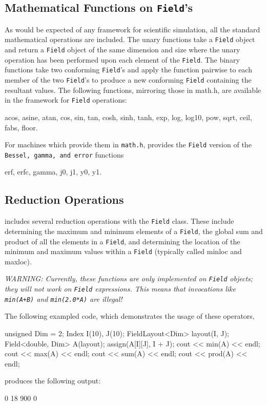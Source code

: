 \subsection{Mathematical Functions on \texttt{Field}'s}

As would be expected of any framework for scientific simulation, all the standard mathematical operations are included. The unary functions take a \texttt{Field} object and return a \texttt{Field} object of the same dimension and size where the unary operation has been performed upon each element of the \texttt{Field}. The binary functions take two conforming \texttt{Field}'s and apply the function pairwise to each member of the two \texttt{Field}'s to produce a new conforming \texttt{Field} containing the resultant values. The following
functions, mirroring those in math.h, are available in the framework for \texttt{Field} operations:
\begin{smallcode}
acos, asine, atan, cos, sin, tan, cosh, sinh, tanh, 
exp, log, log10, pow, sqrt, ceil, fabs, floor.
\end{smallcode}
For machines which provide them in \texttt{math.h}, \ippl provides the \texttt{Field} version of the \texttt{Bessel, gamma, and error} functions
\begin{smallcode}
erf, erfc, gamma, j0, j1, y0, y1.
\end{smallcode}

\subsection{Reduction Operations}

\ippl includes several reduction operations with the \texttt{Field} class. These include determining the maximum and minimum elements of a \texttt{Field}, the global sum and product of all the elements in a \texttt{Field}, and determining the location of the minimum and maximum values within a \texttt{Field} (typically called minloc and maxloc).

\textit{WARNING: Currently, these functions are only implemented on \texttt{Field} objects; they will not work on \texttt{Field} expressions. This means that invocations like \texttt{min(A+B)} and \texttt{min(2.0*A)} are illegal!}

The following exampled code, which demonstrates the usage of these operators,\\
\begin{code}
unsigned Dim = 2;
Index I(10), J(10);
FieldLayout<Dim> layout(I, J);
Field<double, Dim> A(layout);
assign(A[I][J], I + J);
cout << min(A) << endl;
cout << max(A) << endl;
cout << sum(A) << endl;
cout << prod(A) << endl;
\end{code}
produces the following output:
\begin{smallcode}
0
18
900
0
\end{smallcode}

